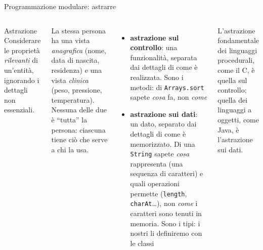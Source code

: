 \documentclass[10pt,aspectratio=169]{beamer}
\begin{document}
\begin{frame}[fragile]{Programmazione modulare: astrarre}
\begin{columns}[T]
\begin{block}{Astrazione}
Considerare le proprietà \emph{rilevanti} di un'entità, ignorando i dettagli non essenziali.
\end{block}

\small
La stessa persona ha una vista \emph{anagrafica} (nome, data di nascita, residenza) e una vista \emph{clinica} (peso, pressione, temperatura). Nessuna delle due è ``tutta'' la persona: ciascuna tiene ciò che serve a chi la usa.
\begin{itemize}\itemsep=3pt
    \item \textbf{astrazione sul controllo}: una funzionalità, separata dai dettagli di come è realizzata. Sono i metodi: di \texttt{Arrays.sort} sapete \emph{cosa} fa, non \emph{come}
    \item \textbf{astrazione sui dati}: un dato, separato dai dettagli di come è memorizzato. Di una \texttt{String} sapete \emph{cosa} rappresenta (una sequenza di caratteri) e quali operazioni permette (\texttt{length}, \texttt{charAt}\ldots), non \emph{come} i caratteri sono tenuti in memoria. Sono i tipi: i nostri li definiremo con le classi
\end{itemize}

\small
L'astrazione fondamentale dei linguaggi procedurali, come il C, è quella sul controllo; quella dei linguaggi a oggetti, come Java, è l'astrazione sui dati.
\end{columns}
\end{frame}
\end{document}
